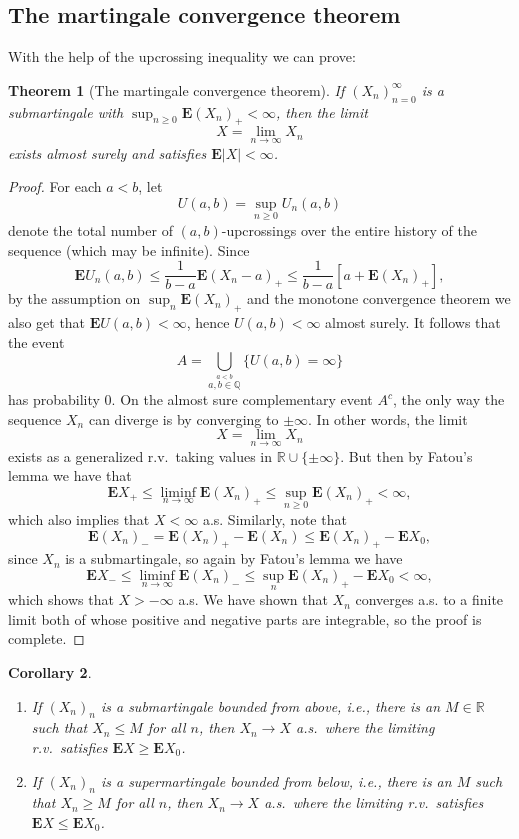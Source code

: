 \documentclass[12pt]{article}
\newtheorem{thm}{Theorem}[section]
\newtheorem{cor}[thm]{Corollary}
\newcommand{\R}{\mathbb{R}}
\newcommand{\expec}{\mathbf{E}}
\theoremstyle{example}
\begin{document}
\subsection{The martingale convergence theorem}

With the help of the upcrossing inequality we can prove:

\begin{thm}[The martingale convergence theorem]
If $(X_n)_{n=0}^\infty$ is a submartingale with $\sup_{n\ge 0}\expec (X_n)_+ < \infty$, then the limit
$$ X = \lim_{n\to\infty} X_n $$
exists almost surely and satisfies $\expec|X|<\infty$.
\end{thm}

\begin{proof}
For each $a<b$, let
$$ U(a,b) = \sup_{n\ge0} U_n(a,b) $$
denote the total number of $(a,b)$-upcrossings over the entire history of the sequence (which may be infinite). Since
$$ \expec U_n(a,b) \le \frac{1}{b-a} \expec(X_n-a)_+ \le \frac{1}{b-a} \left[ a + \expec (X_n)_+ \right],
$$ 
by the assumption on $\sup_n \expec(X_n)_+$ and the monotone convergence theorem we also get that $\expec U(a,b) < \infty$, hence $U(a,b)<\infty$ almost surely. It follows that the event
$$ A = \bigcup_{\stackrel{a<b}{a,b\in\mathbb{Q}}} \{ U(a,b) = \infty \} $$
has probability $0$.
On the almost sure complementary event $A^c$, the only way the sequence $X_n$ can diverge is by converging to $\pm \infty$. In other words, the limit 
$$ X = \lim_{n\to\infty} X_n $$
exists as a generalized r.v.\ taking values in $\R\cup\{\pm\infty\}$.
But then by Fatou's lemma we have that
$$ \expec X_+ \le \liminf_{n\to\infty} \expec (X_n)_+ \le \sup_{n\ge 0} \expec(X_n)_+ < \infty, $$
which also implies that $X<\infty$ a.s. Similarly, note that
$$ \expec (X_n)_- = \expec (X_n)_+ - \expec(X_n) \le \expec (X_n)_+ - \expec X_0, $$
since $X_n$ is a submartingale, so again by Fatou's lemma we have
$$ \expec X_- \le \liminf_{n\to\infty} \expec (X_n)_- \le \sup_n \expec(X_n)_+ - \expec X_0 < \infty, $$
which shows that $X>-\infty$ a.s. We have shown that $X_n$ converges a.s. to a finite limit both of whose positive and negative parts are integrable, so the proof is complete.
\end{proof}


\begin{cor} \label{mart-conv-cor}
\begin{enumerate}
\item If $(X_n)_n$ is a submartingale bounded from above, i.e., there is an $M\in\R$ such that $X_n\le M$ for all $n$, then $X_n\to X$ a.s.\ where the limiting r.v.\ satisfies $\expec X \ge \expec X_0$.
\item If $(X_n)_n$ is a supermartingale bounded from below, i.e., there is an $M$ such that $X_n\ge M$ for all $n$, then $X_n\to X$ a.s.\ where the limiting r.v.\ satisfies $\expec X \le \expec X_0$. 
\end{enumerate}
\end{cor}
\end{document}
